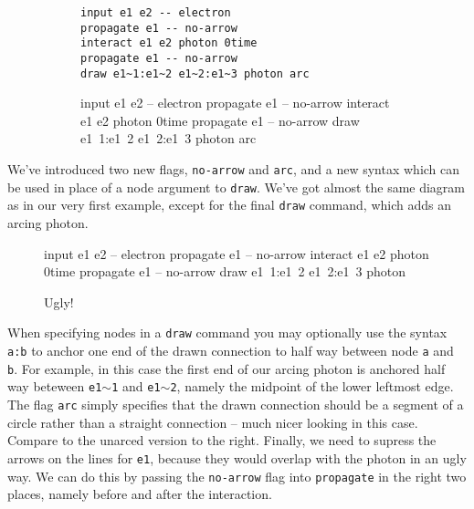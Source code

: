 \documentclass[12pt]{article}
\begin{document}
\begin{figure}[h!]\begin{subfigure}[h]{0.6\textwidth}\begin{center}
\begin{lstlisting}
input e1 e2 -- electron
propagate e1 -- no-arrow
interact e1 e2 photon 0time
propagate e1 -- no-arrow
draw e1~1:e1~2 e1~2:e1~3 photon arc
\end{lstlisting}
\end{center}\end{subfigure}\hfill\vrule\hfill\begin{subfigure}[h]{0.2\textwidth}\begin{center}
\begin{feynr}
input e1 e2 -- electron
propagate e1 -- no-arrow
interact e1 e2 photon 0time
propagate e1 -- no-arrow
draw e1~1:e1~2 e1~2:e1~3 photon arc
\end{feynr}
\end{center}\end{subfigure}\end{figure}
We've introduced two new flags, \texttt{no-arrow} and \texttt{arc}, and a new syntax which can be used in place of a node argument to \texttt{draw}.
We've got almost the same diagram as in our very first example, except for the final \texttt{draw} command, which adds an arcing photon.
\begin{wrapfigure}{r}{0.2\textwidth}
\begin{center}
\begin{feynr}
input e1 e2 -- electron
propagate e1 -- no-arrow
interact e1 e2 photon 0time
propagate e1 -- no-arrow
draw e1~1:e1~2 e1~2:e1~3 photon
\end{feynr}
\caption{Ugly!}
\end{center}
\end{wrapfigure}
When specifying nodes in a \texttt{draw} command you may optionally use the syntax \texttt{a:b} to anchor one end of the drawn connection to half way between node \texttt{a} and \texttt{b}.
For example, in this case the first end of our arcing photon is anchored half way beteween \texttt{e1$\sim$1} and \texttt{e1$\sim$2}, namely the midpoint of the lower leftmost edge.
The flag \texttt{arc} simply specifies that the drawn connection should be a segment of a circle rather than a straight connection -- much nicer looking in this case.
Compare to the unarced version to the right.
Finally, we need to supress the arrows on the lines for \texttt{e1}, because they would overlap with the photon in an ugly way.
We can do this by passing the \texttt{no-arrow} flag into \texttt{propagate} in the right two places, namely before and after the interaction.
\end{document}
